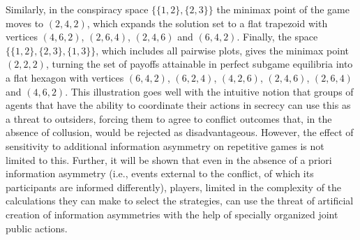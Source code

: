 Similarly, in the conspiracy space $\{\{1, 2\}, \{2, 3\}\}$ the minimax point of the game moves to $(2, 4, 2)$, which expands the solution set to a flat trapezoid with vertices $(4, 6, 2)$, $(2, 6, 4)$, $(2, 4, 6)$ and $(6, 4, 2)$. Finally, the space $\{\{1, 2\}, \{2, 3\}, \{1, 3\}\}$, which includes all pairwise plots, gives the minimax point $(2, 2, 2)$, turning the set of payoffs attainable in perfect subgame equilibria into a flat hexagon with vertices $(6, 4, 2)$, $(6, 2, 4)$, $(4, 2, 6)$, $(2, 4, 6)$, $(2, 6, 4)$ and $(4, 6, 2)$. This illustration goes well with the intuitive notion that groups of agents that have the ability to coordinate their actions in secrecy can use this as a threat to outsiders, forcing them to agree to conflict outcomes that, in the absence of collusion, would be rejected as disadvantageous. However, the effect of sensitivity to additional information asymmetry on repetitive games is not limited to this. Further, it will be shown that even in the absence of a priori information asymmetry (i.e., events external to the conflict, of which its participants are informed differently), players, limited in the complexity of the calculations they can make to select the strategies, can use the threat of artificial creation of information asymmetries with the help of specially organized joint public actions. %

